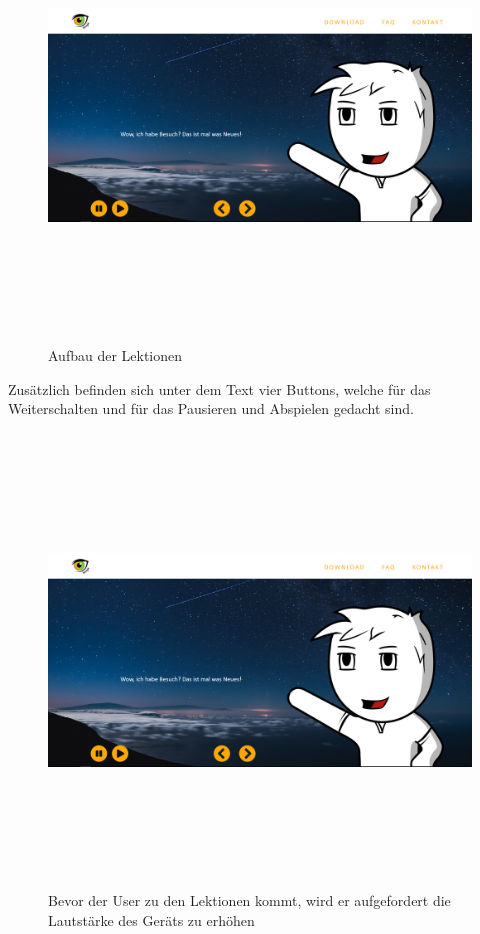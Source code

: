 \begin{figure}[H]
	\centering				\includegraphics[width=12cm,height=12cm,keepaspectratio]{webseite_abb9} 
	\caption{Aufbau der Lektionen}
\end{figure}
Zusätzlich befinden sich unter dem Text vier Buttons, welche für das Weiterschalten und für das Pausieren und Abspielen gedacht sind. 
\begin{figure}[H]
	\centering				\includegraphics[width=12cm,height=12cm,keepaspectratio]{webseite_abb9} 
	\caption{Bevor der User zu den Lektionen kommt, wird er aufgefordert die Lautstärke des Geräts zu erhöhen}
\end{figure}
